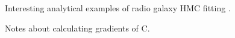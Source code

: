 \documentclass[modern]{aastex62}
\begin{document}
Interesting analytical examples of radio galaxy HMC fitting \citep{rivi19}.



Notes about calculating gradients of C.


\acknowledgments




\end{document}
